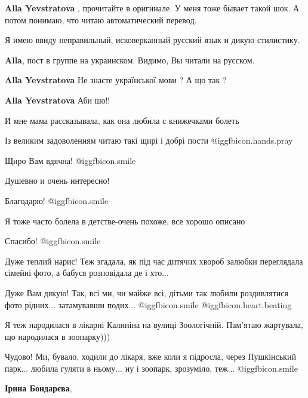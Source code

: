 \begin{itemize}
\textbf{Alla Yevstratova} , прочитайте в оригинале. У меня тоже бывает такой шок. А
потом понимаю, что читаю автоматический перевод.

Я имею ввиду неправильный, исковерканный русский язык и дикую стилистику.

\begin{itemize} %
\textbf{Alla}, пост в группе на украинском. Видимо, Вы читали на русском.

\textbf{Alla Yevstratova} Не знаєте української мови ?
А що так ?

\textbf{Alla Yevstratova} Аби шо!!
\end{itemize} %

И мне мама рассказывала, как она любила с книжечками болеть

Із великим задоволенням читаю такі щирі і добрі пости @igg{fbicon.hands.pray} 

Щиро Вам вдячна! @igg{fbicon.smile} 

Душевно и очень интересно!

Благодарю! @igg{fbicon.smile} 

Я тоже часто болела в детстве-очень похоже, все хорошо описано

Спасибо! @igg{fbicon.smile} 

Дуже теплий нарис! Теж згадала, як під час дитячих хвороб залюбки переглядала
сімейні фото, а бабуся розповідала де і хто...

Дуже Вам дякую! Так, всі ми, чи майже всі, дітьми так любили роздивлятися фото
рідних... затамувавши подих... @igg{fbicon.smile}  @igg{fbicon.heart.beating} 



Я теж народилася в лікарні Калиніна на вулиці Зоологічній. Пам'ятаю жартувала,
що народилася в зоопарку)))

\begin{itemize} %

Чудово! Ми, бувало, ходили до лікаря, вже коли я підросла, через Пушкінський
парк... любила гуляти в ньому... ну і зоопарк, зрозуміло, теж... @igg{fbicon.smile} 


\textbf{Ірина Бондарєва},


\end{itemize}
\end{itemize}
